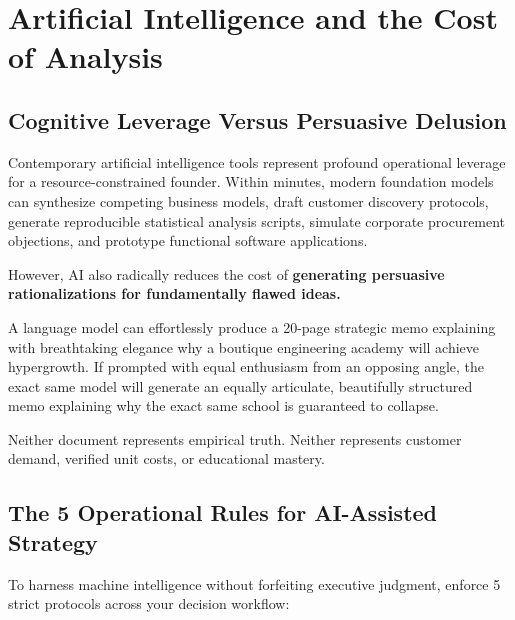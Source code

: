 \section{Artificial Intelligence and the Cost of Analysis}

\subsection{Cognitive Leverage Versus Persuasive Delusion}

Contemporary artificial intelligence tools represent profound operational leverage for a resource-constrained founder. Within minutes, modern foundation models can synthesize competing business models, draft customer discovery protocols, generate reproducible statistical analysis scripts, simulate corporate procurement objections, and prototype functional software applications.

However, AI also radically reduces the cost of \textbf{generating persuasive rationalizations for fundamentally flawed ideas.}

A language model can effortlessly produce a 20-page strategic memo explaining with breathtaking elegance why a boutique engineering academy will achieve hypergrowth. If prompted with equal enthusiasm from an opposing angle, the exact same model will generate an equally articulate, beautifully structured memo explaining why the exact same school is guaranteed to collapse.

Neither document represents empirical truth. Neither represents customer demand, verified unit costs, or educational mastery.

\subsection{The 5 Operational Rules for AI-Assisted Strategy}

To harness machine intelligence without forfeiting executive judgment, enforce 5 strict protocols across your decision workflow:


